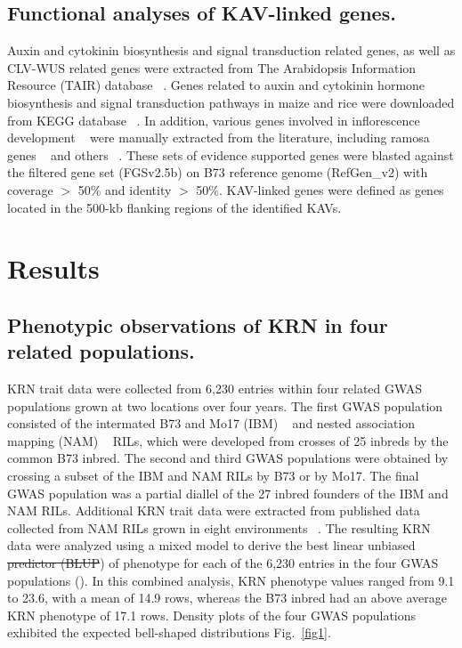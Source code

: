 \documentclass[10pt,letterpaper]{article}
\providecommand{\DIFaddtex}[1]{{\protect\color{blue}\uwave{#1}}} %
\providecommand{\DIFdeltex}[1]{{\protect\color{red}\sout{#1}}}                      %
\providecommand{\DIFaddbegin}{} %
\providecommand{\DIFaddend}{} %
\providecommand{\DIFdelbegin}{} %
\providecommand{\DIFdelend}{} %
\providecommand{\DIFadd}[1]{\texorpdfstring{\DIFaddtex{#1}}{#1}} %
\providecommand{\DIFdel}[1]{\texorpdfstring{\DIFdeltex{#1}}{}} %
\begin{document}
\subsection*{Functional analyses of KAV-linked genes.} 
Auxin and cytokinin biosynthesis and signal transduction related genes, as well as CLV-WUS related genes were extracted from The Arabidopsis Information Resource (TAIR) database ~\cite{Poole2007}. Genes related to auxin and cytokinin hormone biosynthesis and signal transduction pathways in maize and rice were downloaded from KEGG database ~\cite{Kanehisa2002}. In addition, various genes involved in inflorescence development ~\cite{Barazesh2008} were manually extracted from the literature, including ramosa genes ~\cite{Bortiri2006} and others ~\cite{McSteen2001, Upadyayula2006, Xu2011}. These sets of evidence supported genes were blasted against the filtered gene set (FGSv2.5b) on B73 reference genome (RefGen\_v2) with coverage $>$ 50\% and identity $>$ 50\%. KAV-linked genes were defined as genes located in the 500-kb flanking regions of the identified KAVs.


\section*{Results}
\subsection*{Phenotypic observations of KRN in four related populations.}

KRN trait data were collected from 6,230 entries within four related GWAS populations grown at two locations over four years. The first GWAS population consisted of the intermated B73 and Mo17 (IBM) ~\cite{Lee2002} and nested association mapping (NAM) ~\cite{Yu2008} RILs, which were developed from crosses of 25 inbreds by the common B73 inbred. The second and third GWAS populations were obtained by crossing a subset of the IBM and NAM RILs by B73 or by Mo17.  The final GWAS population was a partial diallel of the 27 inbred founders of the IBM and NAM RILs. Additional KRN trait data were extracted from published data collected from NAM RILs grown in eight environments ~\cite{Brown2011}. The resulting KRN data were analyzed using a mixed model to derive the best linear unbiased \DIFdelbegin \DIFdel{predictor (BLUP}\DIFdelend \DIFaddbegin \DIFadd{esimators (BLUE}\DIFaddend ) of phenotype for each of the 6,230 entries in the four GWAS populations (). In this combined analysis, KRN phenotype values ranged from 9.1 to 23.6, with a mean of 14.9 rows, whereas the B73 inbred had an above average KRN phenotype of 17.1 rows. Density plots of the four GWAS populations exhibited the expected bell-shaped distributions Fig.~\ref{fig1}.
\end{document}

